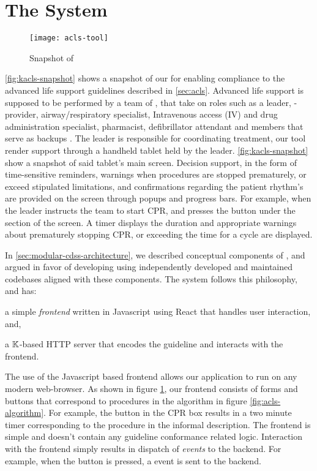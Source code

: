 \section{The \KACLS{} System}\label{sec:kacls-cdss}

\begin{figure}[t!]
  \centering
  \texttt{[image: acls-tool]}
  \caption{Snapshot of \KACLS{}}\label{fig:kacls-snapshot}
\end{figure}

\autoref{fig:kacls-snapshot} shows a snapshot of our \CDSS{} for
enabling compliance to the advanced life support guidelines described in
\autoref{sec:acls}. Advanced life support is supposed to be performed by
a team of \HCPs{}, that take on roles such as a leader, \CPR{}-provider,
airway/respiratory specialist, Intravenous access (IV) and drug administration
specialist, pharmacist, defibrillator attendant and members that serve as
backups \cite{ACLSWikiEntry}. The leader is responsible for coordinating
treatment, our tool render support through a handheld tablet held by the leader.
\autoref{fig:kacls-snapshot} show a snapshot of said tablet's main screen.
Decision support, in the form of time-sensitive reminders, warnings when
procedures are stopped prematurely, or exceed stipulated limitations, and
confirmations regarding the patient rhythm's are provided on the screen
through popups and progress bars. For example, when the leader instructs
the team to start CPR, and presses the  button under the 
section of the screen. A timer displays the duration and appropriate warnings
about prematurely stopping CPR, or exceeding the time for a \CPR{} cycle are
displayed.

In \autoref{sec:modular-cdss-architecture}, we described
conceptual components of \CDSSs{}, and argued in favor
of developing \CDSSs{} using independently developed and maintained codebases
aligned with these components. The \KACLS{} system follows
this philosophy, and has:
\begin{enumerate*}[label=(\roman*)]
  \item a simple \emph{frontend} written in Javascript using React \cite{ReactJSUrl} that handles
    user interaction, and,
  \item a $\mathbb{K}$-based HTTP server that encodes the \ACLS{} guideline
    and interacts with the frontend.
\end{enumerate*}
The use of the Javascript based frontend allows our application
to run on any modern web-browser. As shown in figure \ref{fig:kacls-snapshot},
our frontend consists of forms and buttons that correspond to procedures
in the algorithm in figure \ref{fig:acls-algorithm}. For example, the
 button in the CPR box results in a two minute timer corresponding
to the  procedure in the informal description.
The frontend is simple and doesn't contain any guideline conformance related
logic. Interaction with the frontend simply results in dispatch of
\textit{events} to the backend. For example, when the  button is pressed, a
 event is sent to the backend.



